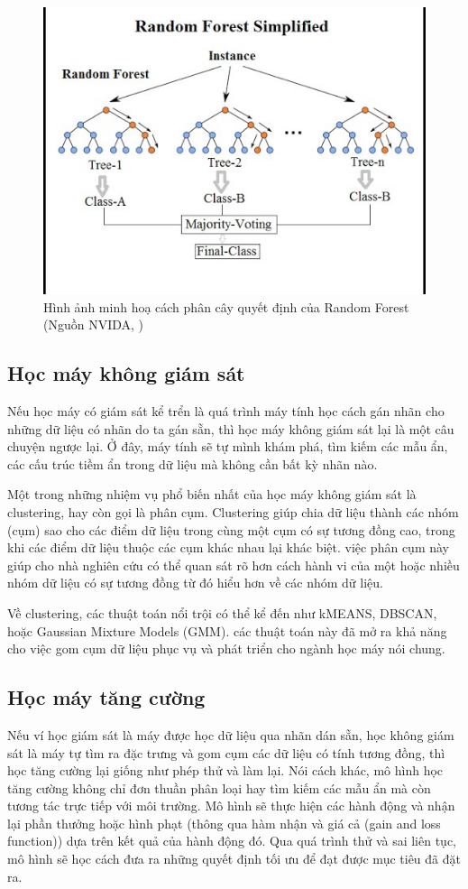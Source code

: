 \begin{figure}
    \centering
    \includegraphics[width=0.8\linewidth]{rf.png}
    \caption{Hình ảnh minh hoạ cách phân cây quyết định của Random Forest (Nguồn NVIDA, \cite{rf_NVIDIA})}
    \label{rfNVIDIA}
\end{figure}
\subsection{Học máy không giám sát}
Nếu học máy có giám sát kể trển là quá trình máy tính học cách gán nhãn cho những dữ liệu có nhãn do ta gán sẵn, thì học máy không giám sát lại là một câu chuyện ngược lại. Ở đây, máy tính sẽ tự mình khám phá, tìm kiếm các mẫu ẩn, các cấu trúc tiềm ẩn trong dữ liệu mà không cần bất kỳ nhãn nào.

Một trong những nhiệm vụ phổ biến nhất của học máy không giám sát là clustering, hay còn gọi là phân cụm. Clustering giúp chia dữ liệu thành các nhóm (cụm) sao cho các điểm dữ liệu trong cùng một cụm có sự tương đồng cao, trong khi các điểm dữ liệu thuộc các cụm khác nhau lại khác biệt. việc phân cụm này giúp cho nhà nghiên cứu có thể quan sát rõ hơn cách hành vi của một hoặc nhiều nhóm dữ liệu có sự tương đồng từ đó hiểu hơn về các nhóm dữ liệu.

Về clustering, các thuật toán nổi trội có thể kể đến như kMEANS, DBSCAN, hoặc Gaussian Mixture Models (GMM). các  thuật toán này đã mở ra khả năng cho việc gom cụm dữ liệu phục vụ và phát triển cho ngành học máy nói chung.


\subsection{Học máy tăng cường}
Nếu ví học giám sát là máy được học dữ liệu qua nhãn dán sẵn, học không giám sát là máy tự tìm ra đặc trưng và gom cụm các dữ liệu có tính tương đồng, thì học tăng cường lại giống như phép thử và làm lại. Nói cách khác, mô hình học tăng cường không chỉ đơn thuần phân loại hay tìm kiếm các mẫu ẩn mà còn tương tác trực tiếp với môi trường. Mô hình sẽ thực hiện các hành động và nhận lại phần thưởng hoặc hình phạt (thông qua hàm nhận và giá cả (gain and loss function)) dựa trên kết quả của hành động đó. Qua quá trình thử và sai liên tục, mô hình sẽ học cách đưa ra những quyết định tối ưu để đạt được mục tiêu đã đặt ra.


